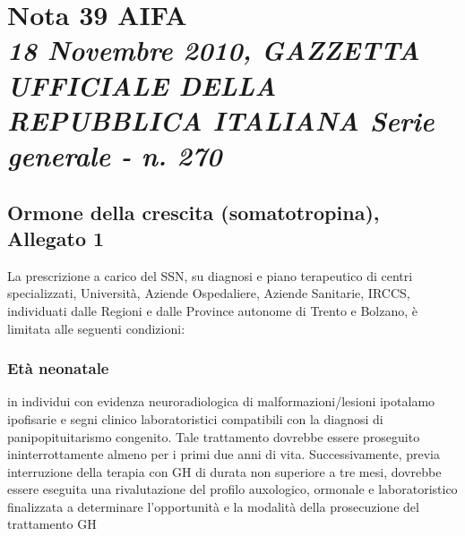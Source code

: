 \chapter[Nota 39 AIFA - 18 Novembre 2010]
	{Nota 39 AIFA\\[.5ex]
	\normalsize\textit{18 Novembre 2010, GAZZETTA UFFICIALE DELLA REPUBBLICA ITALIANA Serie generale - n. 270}}

\section*{Ormone della crescita (somatotropina), Allegato 1}

La prescrizione a carico del SSN, su diagnosi e piano terapeutico di centri specializzati, Universit\`a, Aziende
Ospedaliere, Aziende Sanitarie, IRCCS, individuati dalle Regioni e dalle Province autonome di Trento e
Bolzano, \`e limitata alle seguenti condizioni:

\subsection*{Et\`a neonatale}

in individui con evidenza neuroradiologica di malformazioni/lesioni ipotalamo ipofisarie e segni 
clinico laboratoristici compatibili con la diagnosi di panipopituitarismo congenito. Tale trattamento 
dovrebbe essere proseguito ininterrottamente almeno per i primi due anni di vita. Successivamente, 
previa interruzione della terapia con GH di durata non superiore a tre mesi, dovrebbe essere eseguita 
una rivalutazione del profilo auxologico, ormonale e laboratoristico finalizzata a determinare 
l’opportunità e la modalità della prosecuzione del trattamento GH

